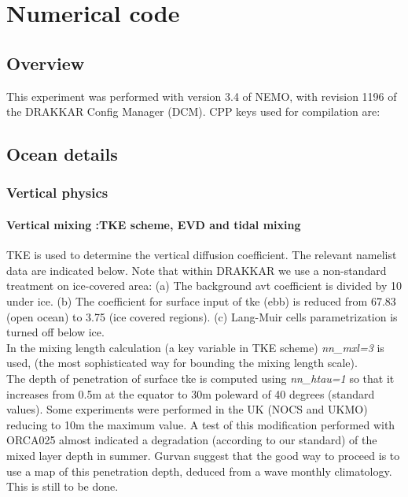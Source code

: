\section{Numerical code}


\subsection{Overview}

This experiment was performed with version 3.4 of NEMO, with revision 1196 of the DRAKKAR Config Manager (DCM). CPP keys used for compilation are:



\subsection{Ocean details}

\subsubsection{Vertical physics}

\paragraph{Vertical mixing :TKE scheme, EVD and tidal mixing \\}

TKE is used to determine the vertical diffusion coefficient. The relevant namelist data are indicated below. 
Note that within DRAKKAR we use a non-standard treatment  on ice-covered area: (a) The background avt 
coefficient is divided by 10 under ice.  (b) The coefficient for 
surface input of tke (ebb) is reduced from 67.83 (open ocean) to 3.75 (ice covered regions). (c) Lang-Muir cells 
parametrization is turned off below ice. \\

In the mixing length calculation (a key variable in TKE scheme) \textit{nn\_mxl=3} is used, (the most sophisticated way for
bounding the mixing length scale). \\
 
The depth of penetration of surface tke is computed using \textit{nn\_htau=1} so that it increases from 0.5m at the equator to 30m 
poleward of 40 degrees (standard values). Some experiments were performed in the UK (NOCS and UKMO) reducing to 10m the maximum
value. A test of this modification performed with ORCA025 almost indicated a degradation (according to our standard) 
of the mixed layer depth in summer. Gurvan suggest that the good way to proceed is to use a map of this 
penetration depth, deduced from a wave monthly climatology. This is still to be done. \\

